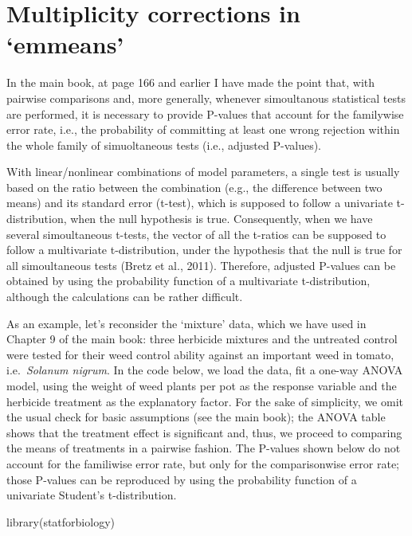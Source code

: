 \documentclass[
  letterpaper,
  DIV=11,
  numbers=noendperiod]{scrreprt}
\newenvironment{Shaded}{\begin{snugshade}}{\end{snugshade}}
\newcommand{\FunctionTok}[1]{\textcolor[rgb]{0.28,0.35,0.67}{#1}}
\newcommand{\NormalTok}[1]{\textcolor[rgb]{0.00,0.23,0.31}{#1}}
\begin{document}
\section{Multiplicity corrections in
`emmeans'}\label{multiplicity-corrections-in-emmeans}

In the main book, at page 166 and earlier I have made the point that,
with pairwise comparisons and, more generally, whenever simoultanous
statistical tests are performed, it is necessary to provide P-values
that account for the familywise error rate, i.e., the probability of
committing at least one wrong rejection within the whole family of
simuoltaneous tests (i.e., adjusted P-values).

With linear/nonlinear combinations of model parameters, a single test is
usually based on the ratio between the combination (e.g., the difference
between two means) and its standard error (t-test), which is supposed to
follow a univariate t-distribution, when the null hypothesis is true.
Consequently, when we have several simoultaneous t-tests, the vector of
all the t-ratios can be supposed to follow a multivariate
t-distribution, under the hypothesis that the null is true for all
simoultaneous tests (Bretz et al., 2011). Therefore, adjusted P-values
can be obtained by using the probability function of a multivariate
t-distribution, although the calculations can be rather difficult.

As an example, let's reconsider the `mixture' data, which we have used
in Chapter 9 of the main book: three herbicide mixtures and the
untreated control were tested for their weed control ability against an
important weed in tomato, i.e.~\emph{Solanum nigrum}. In the code below,
we load the data, fit a one-way ANOVA model, using the weight of weed
plants per pot as the response variable and the herbicide treatment as
the explanatory factor. For the sake of simplicity, we omit the usual
check for basic assumptions (see the main book); the ANOVA table shows
that the treatment effect is significant and, thus, we proceed to
comparing the means of treatments in a pairwise fashion. The P-values
shown below do not account for the familiwise error rate, but only for
the comparisonwise error rate; those P-values can be reproduced by using
the probability function of a univariate Student's t-distribution.

\begin{Shaded}
\begin{Highlighting}[]
\FunctionTok{library}\NormalTok{(statforbiology)}
\end{Highlighting}
\end{Shaded}
\end{document}
